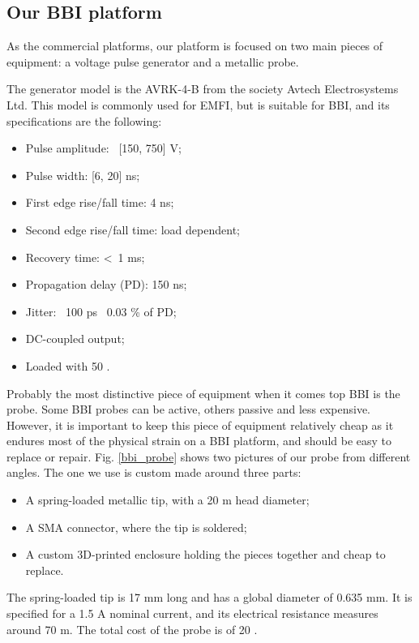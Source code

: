 	\subsection{Our BBI platform}
		As the commercial platforms, our platform is focused on two main pieces of equipment: a voltage pulse generator and a metallic probe.

		The generator model is the AVRK-4-B from the society Avtech Electrosystems Ltd.
		This model is commonly used for EMFI, but is suitable for BBI, and its specifications are the following:
		\begin{itemize}
			\item Pulse amplitude: \textpm\ [150, 750] V;
			\item Pulse width: [6, 20] ns;
			\item First edge rise/fall time: 4 ns;
			\item Second edge rise/fall time: load dependent;
			\item Recovery time: \textless\ 1 ms;
			\item Propagation delay (PD): 150 ns;
			\item Jitter: \textpm\ 100 ps \textpm\ 0.03 \% of PD;
			\item DC-coupled output;
			\item Loaded with 50 \textOmega.
		\end{itemize}
		
		Probably the most distinctive piece of equipment when it comes top BBI is the probe.
		Some BBI probes can be active, others passive and less expensive.
		However, it is important to keep this piece of equipment relatively cheap as it endures most of the physical strain on a BBI platform, and should be easy to replace or repair.
		Fig. \ref{bbi_probe} shows two pictures of our probe from different angles.
		The one we use is custom made around three parts:
		\begin{itemize}
			\item A spring-loaded metallic tip, with a 20 \textmu m head diameter;
			\item A SMA connector, where the tip is soldered;
			\item A custom 3D-printed enclosure holding the pieces together and cheap to replace.
		\end{itemize}
		The spring-loaded tip is 17 mm long and has a global diameter of 0.635 mm.
		It is specified for a 1.5 A nominal current, and its electrical resistance measures around 70 m\textOmega.
		The total cost of the probe is of 20 \texteuro.

